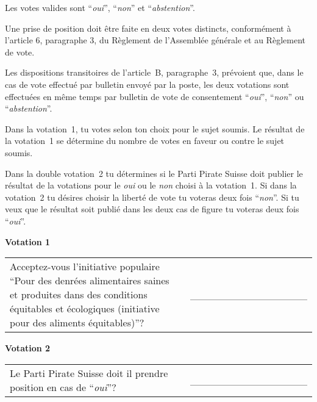 \documentclass[11pt, a4paper]{scrartcl}
\newcommand{\oui}{\enquote{\textit{oui}}}
\newcommand{\non}{\enquote{\textit{non}}}
\newcommand{\abstention}{\enquote{\textit{abstention}}}
\begin{document}
{\begin{minipage}[t][12.5cm][t]{17.7cm}
\vspace{0.2cm}
Les votes valides sont \oui{}, \non{} et \abstention{}.

\vspace{0.2cm}
Une prise de position doit être faite en deux votes distincts, conformément à l'article 6, paragraphe 3, du Règlement de l'Assemblée générale et au Règlement de vote.

\vspace{0.2cm}
Les dispositions transitoires de l'article~B, paragraphe~3, prévoient que, dans le cas de vote effectué par bulletin envoyé par la poste, les deux votations sont effectuées en même temps par bulletin de vote de consentement \oui{}, \non{} ou \abstention{}.

\vspace{0.2cm}
Dans la votation~1, tu votes selon ton choix pour le sujet soumis. Le résultat de la votation~1 se détermine du nombre de votes en faveur ou contre le sujet soumis.

\vspace{0.2cm}
Dans la double votation~2 tu détermines si le Parti Pirate Suisse doit publier le résultat de la votations pour le \textit{oui} ou le \textit{non} choisi à la votation~1. Si dans la votation~2 tu désires choisir la liberté de vote tu voteras deux fois \non{}. Si tu veux que le résultat soit publié dans les deux cas de figure tu voteras deux fois \oui{}.

\vspace{1cm}

\textbf{Votation 1}

\vspace{0.5cm}

\begin{tabular}{ b{13.5cm} b{3cm} }
Acceptez-vous l'initiative populaire \enquote{Pour des denrées alimentaires saines et produites dans des conditions équitables et écologiques (initiative pour des aliments équitables)}?
& \_\_\_\_\_\_\_\_\_\_\_\_\_\_\_\_ \\
\end{tabular}

\vspace{0.5cm}

\textbf{Votation 2}

\vspace{0.5cm}

\begin{tabular}{ b{13.5cm} b{3cm} }
Le Parti Pirate Suisse doit il prendre position en cas de \oui{}?
& \_\_\_\_\_\_\_\_\_\_\_\_\_\_\_\_ \\
\end{tabular}


\end{minipage}}
\end{document}
